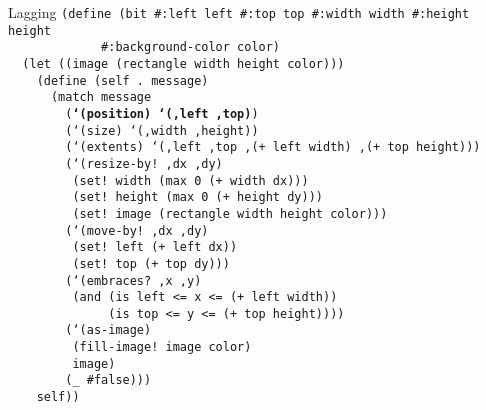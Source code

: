 \begin{frame}{Lagging}
  \tiny
  \texttt{(define (bit \#:left left \#:top top \#:width width \#:height height\\
    \ \ \ \ \ \ \ \ \ \ \ \ \ \#:background-color color)\\
    \ \ (let ((image (rectangle width height color)))\\
    \ \ \ \ (define (self .\ message)\\
    \ \ \ \ \ \ (match message\\
    \ \ \ \ \ \ \ \ (\textbf{`(position) `(,left ,top)})\\
    \ \ \ \ \ \ \ \ (`(size) `(,width ,height))\\
    \ \ \ \ \ \ \ \ (`(extents) `(,left ,top ,(+ left width) ,(+ top height)))\\
    \ \ \ \ \ \ \ \ (`(resize-by!\ ,dx ,dy)\\
    \ \ \ \ \ \ \ \ \ (set!\ width (max 0 (+ width dx)))\\
    \ \ \ \ \ \ \ \ \ (set!\ height (max 0 (+ height dy)))\\
    \ \ \ \ \ \ \ \ \ (set!\ image (rectangle width height color)))\\
    \ \ \ \ \ \ \ \ (`(move-by!\ ,dx ,dy)\\
    \ \ \ \ \ \ \ \ \ (set!\ left (+ left dx))\\
    \ \ \ \ \ \ \ \ \ (set!\ top (+ top dy)))\\
    \ \ \ \ \ \ \ \ (`(embraces?\ ,x ,y)\\
    \ \ \ \ \ \ \ \ \ (and (is left <= x <= (+ left width))\\
    \ \ \ \ \ \ \ \ \ \ \ \ \ \ (is top <= y <= (+ top height))))\\
    \ \ \ \ \ \ \ \ (`(as-image)\\
    \ \ \ \ \ \ \ \ \ (fill-image!\ image color)\\
    \ \ \ \ \ \ \ \ \ image)\\
    \ \ \ \ \ \ \ \ (\_ \#false)))\\
    \ \ \ \ self))
  }
\end{frame}

